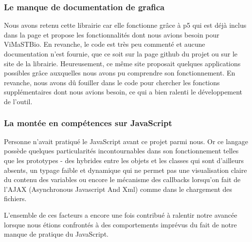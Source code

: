 \bigbreak
\subsubsection{Le manque de documentation de grafica}
\bigbreak
Nous avons retenu cette librairie car elle fonctionne grâce à p5 qui est déjà inclus dans la page et propose les fonctionnalités dont nous avions besoin pour ViMaSTBio. En revanche, le code est très peu commenté et aucune documentation n’est fournie, que ce soit sur la page github du projet ou sur le site de la librairie. Heureusement, ce même site proposait quelques applications possibles grâce auxquelles nous avons pu comprendre son fonctionnement. En revanche, nous avons dû fouiller dans le code pour chercher les fonctions supplémentaires dont nous avions besoin, ce qui a bien ralenti le développement de l’outil.
\bigbreak

\subsubsection{La montée en compétences sur JavaScript}
\bigbreak

Personne n’avait pratiqué le JavaScript avant ce projet parmi nous. Or ce langage possède quelques particularités incontournables dans son fonctionnement telles que les prototypes - des hybrides entre les objets et les classes qui sont d’ailleurs absents, un typage faible et dynamique qui ne permet pas une visualisation claire du contenu des variables ou encore le mécanisme des callbacks lorsqu’on fait de l’AJAX (Asynchronous Javascript And Xml) comme dans le chargement des fichiers.

L’ensemble de ces facteurs a encore une fois contribué à ralentir notre avancée lorsque nous étions confrontés à des comportements imprévus du fait de notre manque de pratique du JavaScript.
